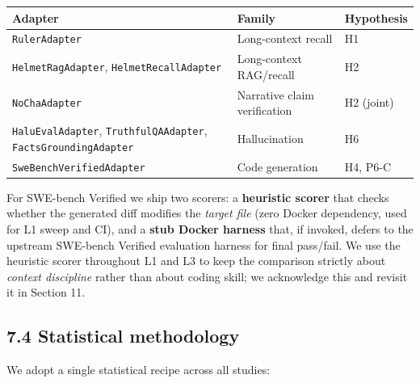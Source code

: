 {\def\LTcaptype{none} %
\begin{longtable}[]{@{}
  >{\raggedright\arraybackslash}p{}
  >{\raggedright\arraybackslash}p{}
  >{\raggedright\arraybackslash}p{}@{}}
\toprule\noalign{}
\begin{minipage}[b]{\linewidth}\raggedright
Adapter
\end{minipage} & \begin{minipage}[b]{\linewidth}\raggedright
Family
\end{minipage} & \begin{minipage}[b]{\linewidth}\raggedright
Hypothesis
\end{minipage} \\
\midrule\noalign{}
\endhead
\bottomrule\noalign{}
\endlastfoot
\texttt{RulerAdapter} & Long-context recall & H1 \\
\texttt{HelmetRagAdapter}, \texttt{HelmetRecallAdapter} & Long-context RAG/recall & H2 \\
\texttt{NoChaAdapter} & Narrative claim verification & H2 (joint) \\
\texttt{HaluEvalAdapter}, \texttt{TruthfulQAAdapter}, \texttt{FactsGroundingAdapter} & Hallucination & H6 \\
\texttt{SweBenchVerifiedAdapter} & Code generation & H4, P6-C \\
\end{longtable}
}

For SWE-bench Verified \citep{openai2024sweverified, jimenez2024swebench} we ship two scorers: a \textbf{heuristic scorer} that checks whether the generated diff modifies the \emph{target file} (zero Docker dependency, used for L1 sweep and CI), and a \textbf{stub Docker harness} that, if invoked, defers to the upstream SWE-bench Verified evaluation harness for final pass/fail. We use the heuristic scorer throughout L1 and L3 to keep the comparison strictly about \emph{context discipline} rather than about coding skill; we acknowledge this and revisit it in Section 11.

\subsection{7.4 Statistical methodology}\label{statistical-methodology}

We adopt a single statistical recipe across all studies:

